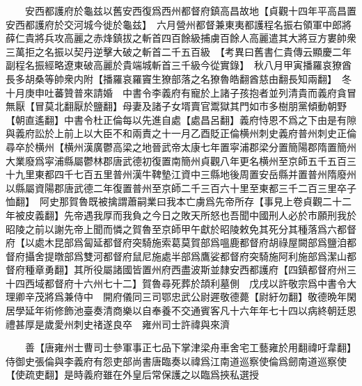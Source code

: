 　　安西都護府於龜兹以舊安西復爲西州都督府鎮高昌故地【貞觀十四年平高昌置安西都護府於交河城今徙於龜兹】　六月營州都督兼東夷都護程名振右領軍中郎將薛仁貴將兵攻高麗之赤烽鎮拔之斬首四百餘級捕虜百餘人高麗遣其大將豆方婁帥衆三萬拒之名振以契丹逆擊大破之斬首二千五百級　【考異曰舊書仁貴傳云顯慶二年副程名振經略遼東破高麗於貴端城斬首三千級今從實錄】　秋八月甲寅播羅哀獠酋長多胡桑等帥衆内附【播羅哀羅竇生獠部落之名獠魯皓翻酋慈由翻長知兩翻】　冬十月庚申吐蕃贊普來請婚　中書令李義府有寵於上諸子孩抱者並列清貴而義府貪冒無厭【冒莫北翻厭於鹽翻】母妻及諸子女壻賣官鬻獄其門如市多樹朋黨傾動朝野【朝直遙翻】中書令杜正倫每以先進自處【處昌呂翻】義府恃恩不爲之下由是有隙與義府訟於上前上以大臣不和兩責之十一月乙酉貶正倫横州刺史義府普州刺史正倫尋卒於横州【横州漢廣鬱高梁之地晉武帝太康七年置寜浦郡梁分置簡陽郡隋置簡州大業廢爲寜浦縣屬鬱林郡唐武德初復置南簡州貞觀八年更名横州至京師五千五百三十九里東都四千七百五里普州漢牛鞞墊江資中三縣地後周置安岳縣并置普州隋廢州以縣屬資陽郡唐武德二年復置普州至京師二千三百六十里至東都三千二百三里卒子恤翻】　阿史那賀魯既被擒謂蕭嗣業曰我本亡虜爲先帝所存【事見上卷貞觀二十二年被皮義翻】先帝遇我厚而我負之今日之敗天所怒也吾聞中國刑人必於市願刑我於昭陵之前以謝先帝上聞而憐之賀魯至京師甲午獻於昭陵敕免其死分其種落爲六都督府【以處木昆部爲匐延都督府突騎施索葛莫賀部爲嗢鹿都督府胡祿屋闕部爲鹽洎都督府攝舍提暾部爲雙河都督府鼠尼施處半部爲鷹娑都督府突騎施阿利施部爲潔山都督府種章勇翻】其所役屬諸國皆置州府西盡波斯並隸安西都護府【四鎮都督府州三十四西域都督府十六州七十二】賀魯尋死葬於頡利墓側　戊戌以許敬宗爲中書令大理卿辛茂將爲兼侍中　開府儀同三司鄂忠武公尉遲敬德薨【尉紆勿翻】敬德晩年閑居學延年術修飾池臺奏清商樂以自奉養不交通賓客凡十六年年七十四以病終朝廷恩禮甚厚是歲愛州刺史禇遂良卒　雍州司士許禕與來濟

　　善【唐雍州士曹司士參軍事正七品下掌津梁舟車舍宅工藝雍於用翻禕吁韋翻】侍御史張倫與李義府有怨吏部尚書唐臨奏以禕爲江南道巡察使倫爲劒南道巡察使【使疏吏翻】是時義府雖在外皇后常保護之以臨爲挾私選授

